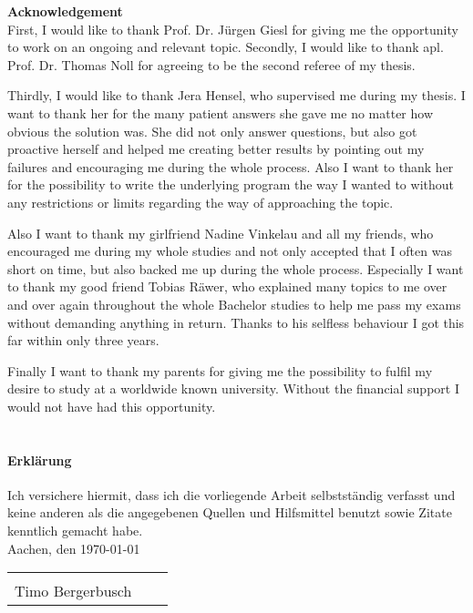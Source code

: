 {\bf\Large Acknowledgement} \\ [1em] 

First, I would like to thank Prof. Dr. Jürgen Giesl for giving me the opportunity to work on an ongoing and relevant topic.
Secondly, I would like to thank apl. Prof. Dr. Thomas Noll for agreeing to be the second referee of my thesis.

Thirdly, I would like to thank Jera Hensel, who supervised me during my thesis. I want to thank her for the many patient answers she gave me no matter how obvious the solution was. She did not only answer questions, but also got proactive herself and helped me creating better results by pointing out my failures and encouraging me during the whole process. Also I want to thank her for the possibility to write the underlying program the way I wanted to without any restrictions or limits regarding the way of approaching the topic. 

Also I want to thank my girlfriend Nadine Vinkelau and all my friends, who encouraged me during my whole studies and not only accepted that I often was short on time, but also backed me up during the whole process. Especially I want to thank my good friend Tobias Räwer, who explained many topics to me over and over again throughout the whole Bachelor studies to help me pass my exams without demanding anything in return. Thanks to his selfless behaviour I got this far within only three years.

Finally I want to thank my parents for giving me the possibility to fulfil my desire to study at a worldwide known university. Without the financial support I would not have had this opportunity. \\ \\

\paragraph{Erklärung} Ich versichere hiermit, dass ich die vorliegende Arbeit selbstständig verfasst und keine
anderen als die angegebenen Quellen und Hilfsmittel benutzt sowie Zitate kenntlich
gemacht habe.\newline \\
Aachen, den \myformat\today

\begin{tabular}{lp{2em}l} 
	\hspace{4cm} \\\cline{1-1}\cline{3-3} 
	Timo Bergerbusch
\end{tabular}
